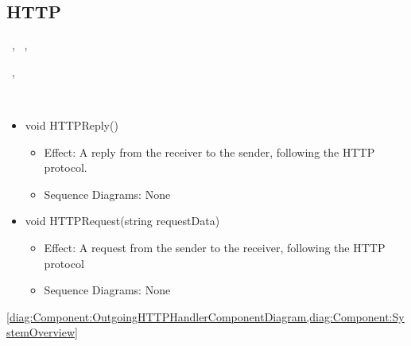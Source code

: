   \subsection{HTTP}\label{int:InterfacesHTTP}
    \begin{description}
      \item[Provided by:] \iconcomponent{}~, \iconcomponent{}~, \iconcomponent{}~
      \item[Required by:] \iconcomponent{}~, \iconcomponent{}~ 
      \item[Operations:] ~
    \begin{itemize}[noitemsep,nolistsep,leftmargin=-.25cm]
      \item \textsf{void HTTPReply()}
        \begin{itemize}[noitemsep,nolistsep]
           \item Effect: A reply from the receiver to the sender, following the HTTP protocol. 
           \item Sequence Diagrams: None
        \end{itemize}
      \item \textsf{void HTTPRequest(string requestData)}
        \begin{itemize}[noitemsep,nolistsep]
           \item Effect: A request from the sender to the receiver, following the HTTP protocol 
           \item Sequence Diagrams: None
        \end{itemize}
    \end{itemize}
      \item[Diagrams:] \cref{diag:Component:OutgoingHTTPHandlerComponentDiagram,diag:Component:SystemOverview}
    \end{description}

